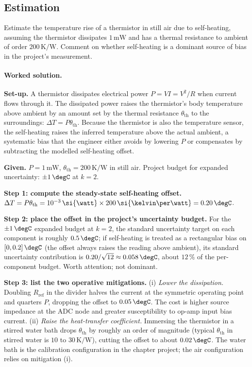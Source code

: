 \subsection*{Estimation}

\begin{exercise}
Estimate the temperature rise of a thermistor in still air due to
self-heating, assuming the thermistor dissipates $1 \,\si{\milli
\watt}$ and has a thermal resistance to ambient of order $200 \,\si
{\kelvin\per\watt}$. Comment on whether self-heating is a dominant
source of bias in the project's measurement.
\end{exercise}

\paragraph{Worked solution.}
\textbf{Set-up.} A thermistor dissipates electrical power $P = V
I = V^{2}/R$ when current flows through it. The dissipated power
raises the thermistor's body temperature above ambient by an
amount set by the thermal resistance $\theta_{\text{th}}$ to the
surroundings: $\Delta T = P \theta_{\text{th}}$. Because the
thermistor is also the temperature sensor, the self-heating
raises the inferred temperature above the actual ambient, a
systematic bias that the engineer either avoids by lowering $P$
or compensates by subtracting the modelled self-heating offset.

\textbf{Given.} $P = 1 \,\si{\milli\watt}$, $\theta_{\text{th}} =
200 \,\si{\kelvin\per\watt}$ in still air. Project budget for
expanded uncertainty: $\pm 1 \,\degC$ at $k = 2$.

\textbf{Step 1: compute the steady-state self-heating offset.}
$\Delta T = P \theta_{\text{th}} = 10^{-3} \,\si{\watt} \times 200
\,\si{\kelvin\per\watt} = 0.20 \,\degC$.

\textbf{Step 2: place the offset in the project's uncertainty
budget.} For the $\pm 1 \,\degC$ expanded budget at $k = 2$, the
standard uncertainty target on each component is roughly $0.5 \,
\degC$; if self-heating is treated as a rectangular bias on
$[0, 0.2] \,\degC$ (the offset always raises the reading above
ambient), its standard uncertainty contribution is $0.20/\sqrt{12}
\approx 0.058 \,\degC$, about $12\,\%$ of the per-component
budget. Worth attention; not dominant.

\textbf{Step 3: list the two operative mitigations.} (i)
\emph{Lower the dissipation.} Doubling $R_{\text{ref}}$ in the
divider halves the current at the symmetric operating point and
quarters $P$, dropping the offset to $0.05 \,\degC$. The cost is
higher source impedance at the ADC node and greater susceptibility
to op-amp input bias current. (ii) \emph{Raise the heat-transfer
coefficient.} Immersing the thermistor in a stirred water bath
drops $\theta_{\text{th}}$ by roughly an order of magnitude
(typical $\theta_{\text{th}}$ in stirred water is $10$ to $30
\,\si{\kelvin\per\watt}$), cutting the offset to about $0.02 \,
\degC$. The water bath is the calibration configuration in the
chapter project; the air configuration relies on mitigation (i).

